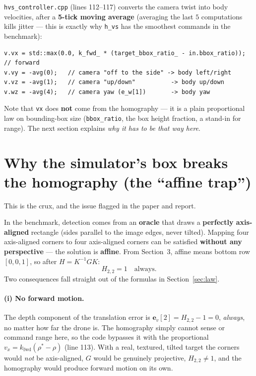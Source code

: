 \documentclass[11pt]{article}
\begin{document}
\texttt{hvs\_controller.cpp} (lines 112--117) converts the camera twist into
body velocities, after a \textbf{5-tick moving average} (averaging the last $5$
computations kills jitter --- this is exactly why \texttt{h\_vs} has the
smoothest commands in the benchmark):

\begin{lstlisting}
v.vx = std::max(0.0, k_fwd_ * (target_bbox_ratio_ - in.bbox_ratio)); // forward
v.vy = -avg(0);   // camera "off to the side" -> body left/right
v.vz = -avg(1);   // camera "up/down"          -> body up/down
v.wz = -avg(4);   // camera yaw (e_w[1])       -> body yaw
\end{lstlisting}

Note that \texttt{vx} does \textbf{not} come from the homography --- it is a plain
proportional law on bounding-box size (\texttt{bbox\_ratio}, the box height
fraction, a stand-in for range). The next section explains \emph{why it has to
be that way here}.

\section{Why the simulator's box breaks the homography (the ``affine trap'')}
\label{sec:affinetrap}

This is the crux, and the issue flagged in the paper and report.

In the benchmark, detection comes from an \textbf{oracle} that draws a
\textbf{perfectly axis-aligned} rectangle (sides parallel to the image edges,
never tilted). Mapping four axis-aligned corners to four axis-aligned corners can
be satisfied \textbf{without any perspective} --- the solution is
\textbf{affine}. From Section~3, affine means bottom row $[0,0,1]$, so after
$H=K^{-1}GK$:
\[
H_{2,2}=1\quad\text{always.}
\]
Two consequences fall straight out of the formulas in Section~\ref{sec:law}.

\paragraph{(i) No forward motion.}
The depth component of the translation error is
$\mathbf{e}_v[2]=H_{2,2}-1=0$, \emph{always}, no matter how far the drone is.
The homography simply cannot sense or command range here, so the code bypasses
it with the proportional $v_x=k_{\mathrm{fwd}}(\rho^{*}-\rho)$ (line 113). With a
real, textured, tilted target the corners would \emph{not} be axis-aligned, $G$
would be genuinely projective, $H_{2,2}\neq1$, and the homography would produce
forward motion on its own.
\end{document}

